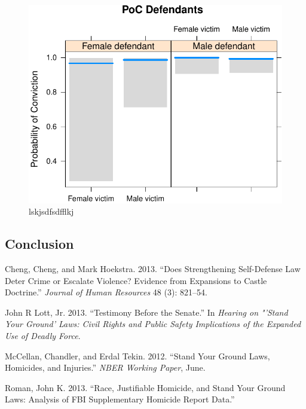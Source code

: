 \documentclass[12pt,article]{article}
\begin{document}
\begin{figure}[htbp]
\centering
\includegraphics{stand_your_ground_article_files/figure-latex/unnamed-chunk-5.pdf}
\caption{lskjsdfsdfflkj}
\end{figure}

\subsection*{Conclusion}\label{conclusion}

Cheng, Cheng, and Mark Hoekstra. 2013. ``Does Strengthening Self-Defense
Law Deter Crime or Escalate Violence? Evidence from Expansions to Castle
Doctrine.'' \emph{Journal of Human Resources} 48 (3): 821--54.

John R Lott, Jr. 2013. ``Testimony Before the Senate.'' In \emph{Hearing
on "'Stand Your Ground' Laws: Civil Rights and Public Safety
Implications of the Expanded Use of Deadly Force}.

McCellan, Chandler, and Erdal Tekin. 2012. ``Stand Your Ground Laws,
Homicides, and Injuries.'' \emph{NBER Working Paper}, June.

Roman, John K. 2013. ``Race, Justifiable Homicide, and Stand Your Ground
Laws: Analysis of FBI Supplementary Homicide Report Data.''
\end{document}
